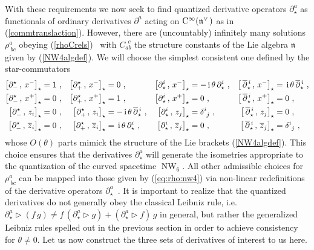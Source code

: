 \documentclass[11pt,a4paper]{article}
\DeclareMathOperator{\NW}{NW}
\newcommand{\1}{\mathbb{1}}
\def\ii{{\,{\rm i}\,}}
\def\CC{{\rm C}}
\def\mfn{{\mathfrak n}}
\begin{document}
With these requirements we now seek to find quantized derivative
operators $\partial_\star^a$ as functionals of ordinary derivatives
$\partial^a$ acting on $\CC^\infty(\mfn^{\vee\,})$ as in
(\ref{commtranslaction}). However, there are (uncountably) infinitely
many solutions $\rho^a_{~bc}$ obeying (\ref{rhoCrels})~\cite{DMT1} with
$C_{ab}^{~~c}$ the structure constants of the Lie algebra $\mfn$ given
by (\ref{NW4algdef}). We will choose the simplest consistent one
defined by the star-commutators
\begin{align}
  \nonumber
  \left[\partial_-^\star\,,\,x^-\right]_\star&=1 \ ,
  &\left[\partial_+^\star\,,\,x^-\right]_\star&=0 \ ,
  &\left[\partial_\star^i\,,\,x^-\right]_\star&=-\ii\theta\,\partial_\star^i \
,
  &\left[\,\overline{\partial}{}_\star^{\,i}\,,\,x^-\right]_\star&=
  \ii\theta\,\overline{\partial}{}_\star^{\,i} \ ,
  \\ \nonumber
  \left[\partial_-^\star\,,\,x^+\right]_\star&=0 \ ,
  &\left[\partial_+^\star\,,\,x^+\right]_\star &=1 \ ,
  &\left[\partial_\star^i\,,\,x^+\right]_\star&=0 \ ,
  &\left[\,\overline{\partial}{}_\star^{\,i}\,,\,x^+\right]_\star&=0 \ ,
  \\ \nonumber
  \left[\partial_-^\star\,,\,z_i\right]_\star&=0 \ ,
  &\left[\partial_+^\star\,,\,z_i\right]_\star&=-\ii\theta\,
  \overline{\partial}{}^{\,i}_\star \ ,
  &\left[\partial_\star^i\,,\,z_j\right]_\star&=\delta^i_{~j} \ ,
  &\left[\,\overline{\partial}{}_\star^{\,i}\,,\,z_j\right]_\star&=0 \ ,
  \\
  \left[\partial_-^\star\,,\,\overline{z}_i\right]_\star&=0  \ ,
  &\left[\partial_+^\star\,,\,\overline{z}_i\right]_\star&=
  \ii\theta\,\partial_\star^i \ ,
  &\left[\partial_\star^i\,,\,\overline{z}_j\right]_\star&=0 \ ,
  &\left[\,\overline{\partial}{}_\star^{\,i}\,,\,\overline{z}_j\right]_\star&
  =\delta^i_{~j} \ ,
\label{eq:rho:nw4}\end{align}
whose $O(\theta)$ parts mimick the structure of the Lie brackets
(\ref{NW4algdef}). This choice ensures that the derivatives
$\partial_\star^a$ will generate the isometries appropriate to the
quantization of the curved spacetime $\NW_6$. All other admissible
choices for $\rho^a_{~bc}$ can be mapped into those given by
(\ref{eq:rho:nw4}) via non-linear redefinitions of the derivative
operators $\partial^a_\star$~\cite{DMT1}. It is
important to realize that the quantized derivatives do not generally
obey the classical Leibniz rule,
i.e. $\partial_\star^a\triangleright(f\,g)\neq
f\,(\partial_\star^a\triangleright g)+(\partial_\star^a\triangleright
f)\,g$ in general, but rather the generalized Leibniz rules spelled
out in the previous section in order to achieve consistency for
$\theta\neq0$. Let us now construct the three sets of derivatives of
interest to us here.
\end{document}
